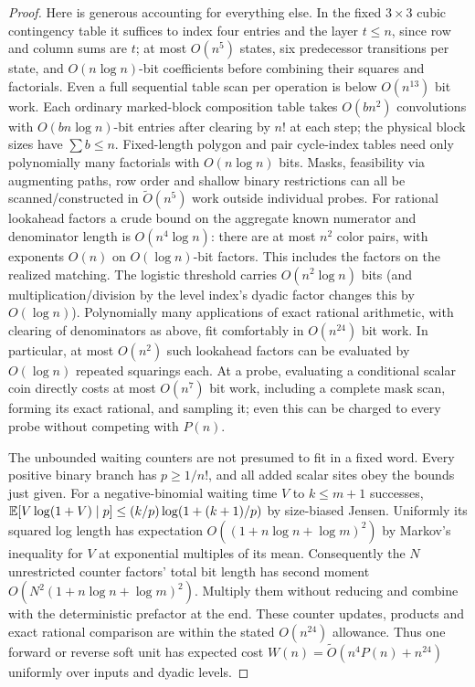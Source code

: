 \begin{proof}
Here is generous accounting for everything else. In the fixed $3\times3$
cubic contingency table it suffices to index four entries and the layer
$t\le n$, since row and column sums are $t$; at most $O(n^5)$ states,
six predecessor transitions per state, and $O(n\log n)$-bit coefficients
before combining their squares and factorials. Even a full sequential
table scan per operation is below $O(n^{13})$ bit work. Each ordinary
marked-block composition table takes $O(bn^2)$ convolutions with
$O(bn\log n)$-bit entries after clearing by $n!$ at each step; the
physical block sizes have $\sum b\le n$. Fixed-length polygon and pair
cycle-index tables need only polynomially many factorials with
$O(n\log n)$ bits. Masks, feasibility via augmenting paths, row order
and shallow binary restrictions can all be scanned/constructed in
$\widetilde O(n^5)$ work outside individual probes. For rational
lookahead factors a crude bound on the aggregate known numerator and
denominator length is $O(n^4\log n)$: there are at most $n^2$ color
pairs, with exponents $O(n)$ on $O(\log n)$-bit factors. This includes
the factors on the realized matching. The logistic threshold carries
$O(n^2\log n)$ bits (and multiplication/division by the level index's
dyadic factor changes this by $O(\log n)$). Polynomially many applications
of exact rational arithmetic, with clearing of denominators as above,
fit comfortably in $O(n^{24})$ bit work. In particular, at most
$O(n^2)$ such lookahead factors can be evaluated by $O(\log n)$ repeated
squarings each. At a probe, evaluating a conditional scalar coin
directly costs at most $O(n^7)$ bit work, including a complete mask scan,
forming its exact rational, and sampling it; even this can be charged to
every probe without competing with $P(n)$.

The unbounded waiting counters are not presumed to fit in a fixed word.
Every positive binary branch has $p\ge1/n!$, and all added scalar
sites obey the bounds just given. For a negative-binomial waiting time
$V$ to $k\le m+1$ successes,
$\mathbb E[V\log(1+V)\mid p]\le(k/p)\log(1+(k+1)/p)$ by size-biased
Jensen. Uniformly its squared log length has expectation
$O((1+n\log n+\log m)^2)$ by Markov's inequality for $V$ at
exponential multiples of its mean. Consequently the $N$ unrestricted
counter factors' total bit length has second moment
$O(N^2(1+n\log n+\log m)^2)$. Multiply them without reducing and
combine with the deterministic prefactor at the end. These counter
updates, products and exact rational comparison are within the stated
$O(n^{24})$ allowance. Thus one forward or reverse soft unit has
expected cost $W(n)=\widetilde O(n^4P(n)+n^{24})$ uniformly over
inputs and dyadic levels.


\end{proof}

